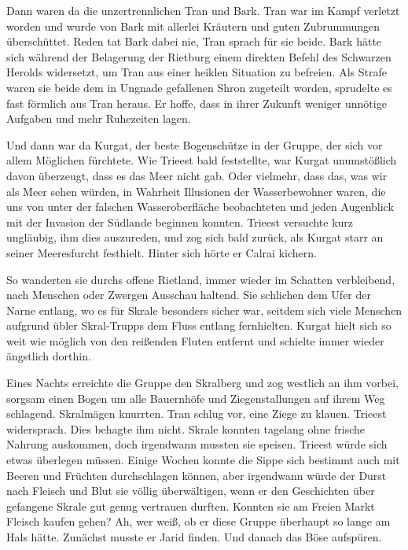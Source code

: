 Dann waren da die unzertrennlichen Tran und Bark. Tran war im Kampf verletzt worden und wurde von Bark mit allerlei Kräutern und guten Zubrummungen überschüttet. Reden tat Bark dabei nie, Tran sprach für sie beide. Bark hätte sich während der Belagerung der Rietburg einem direkten Befehl des Schwarzen Herolds widersetzt, um Tran aus einer heiklen Situation zu befreien. Als Strafe waren sie beide dem in Ungnade gefallenen Shron zugeteilt worden, sprudelte es fast förmlich aus Tran heraus. Er hoffe, dass in ihrer Zukunft weniger unnötige Aufgaben und mehr Ruhezeiten lagen.

Und dann war da Kurgat, der beste Bogenschütze in der Gruppe, der sich vor allem Möglichen fürchtete. Wie Trieest bald feststellte, war Kurgat unumstößlich davon überzeugt, dass es das Meer nicht gab. Oder vielmehr, dass das, was wir als Meer sehen würden, in Wahrheit Illusionen der Wasserbewohner waren, die uns von unter der falschen Wasseroberfläche beobachteten und jeden Augenblick mit der Invasion der Südlande beginnen konnten. Trieest versuchte kurz ungläubig, ihm dies auszureden, und zog sich bald zurück, als Kurgat starr an seiner Meeresfurcht festhielt. Hinter sich hörte er Calrai kichern.

So wanderten sie durchs offene Rietland, immer wieder im Schatten verbleibend, nach Menschen oder Zwergen Ausschau haltend. Sie schlichen dem Ufer der Narne entlang, wo es für Skrale besonders sicher war, seitdem sich viele Menschen aufgrund übler Skral-Trupps dem Fluss entlang fernhielten. Kurgat hielt sich so weit wie möglich von den reißenden Fluten entfernt und schielte immer wieder ängstlich dorthin.



\trennzeichen



Eines Nachts erreichte die Gruppe den Skralberg und zog westlich an ihm vorbei, sorgsam einen Bogen um alle Bauernhöfe und Ziegenstallungen auf ihrem Weg schlagend. Skralmägen knurrten. Tran schlug vor, eine Ziege zu klauen. Trieest widersprach. Dies behagte ihm nicht. Skrale konnten tagelang ohne frische Nahrung auskommen, doch irgendwann mussten sie speisen. Trieest würde sich etwas überlegen müssen. Einige Wochen konnte die Sippe sich bestimmt auch mit Beeren und Früchten durchschlagen können, aber irgendwann würde der Durst nach Fleisch und Blut sie völlig überwältigen, wenn er den Geschichten über gefangene Skrale gut genug vertrauen durften. Konnten sie am Freien Markt Fleisch kaufen gehen? Ah, wer weiß, ob er diese Gruppe überhaupt so lange am Hals hätte. Zunächst musste er Jarid finden. Und danach das Böse aufspüren.

